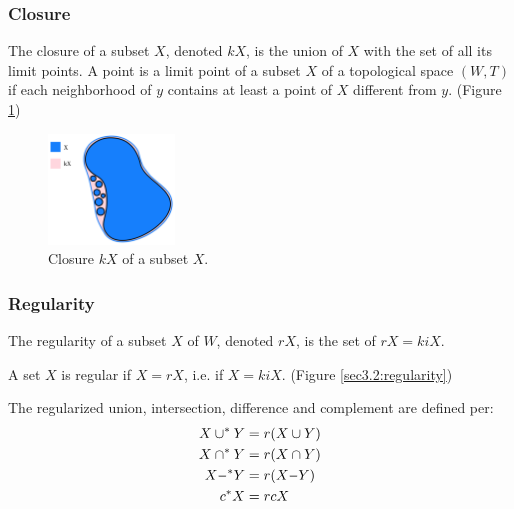 \documentclass[a4paper,11pt,oneside]{article}
\newcommand{\minus}{\scalebox{0.9}[1.0]{$-$}} %
\begin{document}
\subsubsection{Closure}
    
\begin{definition}
	The closure of a subset $X$, denoted $kX$, is the union of $X$ with the set of all its limit points. A point is a limit point of a subset $X$ of a topological space $(W, T)$ if each neighborhood of $y$ contains at least a point of $X$ different from $y$.  \cite{Requicha1978MathematicalFO} (Figure \ref{sec3.2:closure})
\end{definition}
    
\begin{figure}[ht]
	\begin{center}
		\includegraphics[width=0.3\textwidth]{section3/3.2/closure.png}
	\end{center}
	\caption{Closure $kX$ of a subset $X$.}
	\label{sec3.2:closure}
\end{figure}
    
\subsubsection{Regularity}
    
\begin{definition}[Regularity]
	The regularity of a subset $X$ of $W$, denoted $rX$, is the set of $rX = kiX$. \cite{mansfield_1987}
\end{definition}
\begin{definition}
	A set $X$ is regular if $X = rX$, i.e. if $X = kiX$.  \cite{mansfield_1987} (Figure \ref{sec3.2:regularity}) 
\end{definition}
    
\begin{definition}
	The regularized union, intersection, difference and complement are defined per:
	\begin{align*} 
		X \cup^* Y  & = r(X \cup Y)   \\
		X \cap^* Y  & = r(X \cap Y)   \\
		X \minus^*Y & = r(X \minus Y) \\
		c{^*}X      & = rcX           
	\end{align*}
\end{definition}
    
\end{document}
